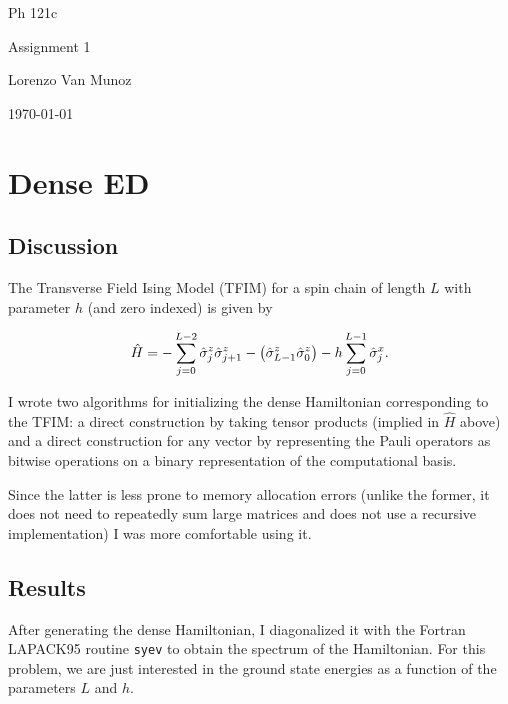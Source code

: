 \documentclass{article}
\begin{document}
{\centering

Ph 121c

Assignment 1

Lorenzo Van Munoz

\today

}

\tableofcontents

\newpage

\section{
Dense ED
}

\subsection{
Discussion
}

The Transverse Field Ising Model (TFIM) for a spin chain
of length $L$ with parameter $h$ (and zero indexed) is given by

\begin{align}
    \hat H = - \sum_{j=0}^{L-2} \hat \sigma^z_{j} \hat \sigma^z_{j+1} 
            - \qty( \hat \sigma^z_{L-1}  \hat \sigma^z_{0} )
            - h\sum_{j=0}^{L-1}  \hat \sigma^x_{j}.
\end{align}

I wrote two algorithms for initializing the dense Hamiltonian
corresponding to the TFIM: a direct construction by taking
tensor products (implied in $\hat H$ above) and a direct construction
for any vector by representing the Pauli operators
as bitwise operations on a binary representation of the computational basis.

Since the latter is less prone to memory allocation errors 
(unlike the former, it does not need to repeatedly sum large matrices
and does not use a recursive implementation) I was more comfortable using it.

\subsection{
Results
}

After generating the dense Hamiltonian, I diagonalized it
with the Fortran LAPACK95 routine {\tt syev} to obtain the
spectrum of the Hamiltonian.
For this problem, we are just interested in the ground state
energies as a function of the parameters $L$ and $h$.

\begin{figure}[h]

\end{figure}
\end{document}
